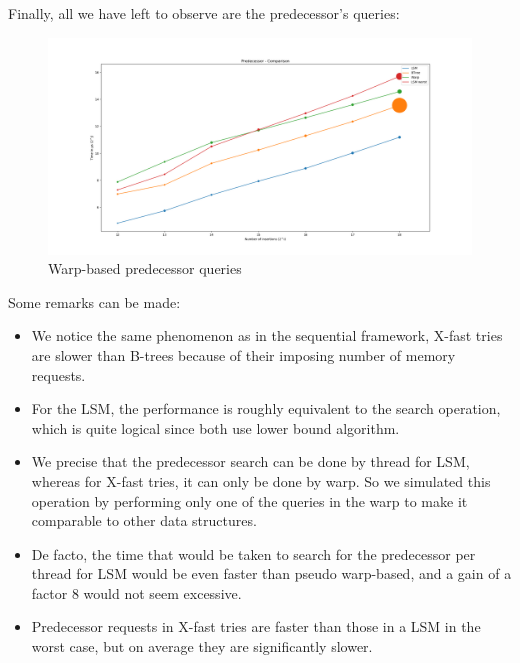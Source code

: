 \newpage

Finally, all we have left to observe are the predecessor's queries:

\begin{figure}[!htb]
    \centering
    \includegraphics[width=\linewidth]{Chapters/ParallelXFastTries/Predecessor.png} 
    \caption{Warp-based predecessor queries}
\end{figure}

Some remarks can be made:
\begin{itemize}
    \item We notice the same phenomenon as in the sequential framework, X-fast tries are slower than B-trees because of their imposing number of memory requests.
    \item For the LSM, the performance is roughly equivalent to the search operation, which is quite logical since both use lower bound algorithm.
    \item We precise that the predecessor search can be done by thread for LSM, whereas for X-fast tries, it can only be done by warp. So we simulated this operation by performing only one of the queries in the warp to make it comparable to other data structures.
    \item De facto, the time that would be taken to search for the predecessor per thread for LSM would be even faster than pseudo warp-based, and a gain of a factor 8 would not seem excessive.
    \item Predecessor requests in X-fast tries are faster than those in a LSM in the worst case, but on average they are significantly slower.
\end{itemize}
